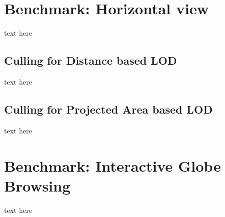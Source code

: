 \section{Benchmark: Horizontal view}
text here

\subsection{Culling for Distance based LOD}
text here

\subsection{Culling for Projected Area based LOD}
text here

\section{Benchmark: Interactive Globe Browsing}
text here

